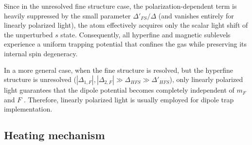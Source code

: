 Since in the unresolved fine structure case, the polarization-dependent term is heavily suppressed by the small parameter $\Delta'_{FS}/\Delta$ (and vanishes entirely for linearly polarized light), the atom effectively acquires only the scalar light shift of the unperturbed $s$ state. Consequently, all hyperfine and magnetic sublevels experience a uniform trapping potential that confines the gas while preserving its internal spin degeneracy.

In a more general case, when the fine structure is resolved, but the hyperfine structure is unresolved ($|\Delta_{1,F}|,|\Delta_{2,F}|\gg \Delta_{HFS} \gg \Delta'_{HFS}$), only linearly polarized light guarantees that the dipole potential becomes completely independent of $m_F$ and $F$ \cite{grimm}. Therefore, linearly polarized light is usually employed for dipole trap implementation.


\subsection{Heating mechanism}
